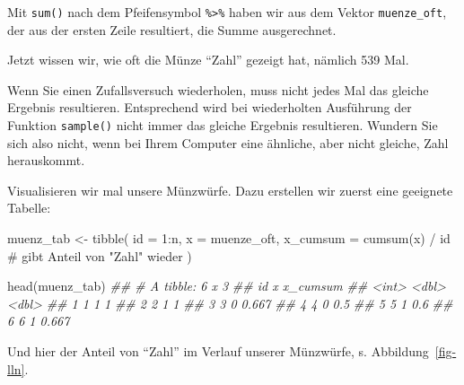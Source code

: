 \documentclass[
  a4paper,
  DIV=11]{scrreprt}
\newenvironment{Shaded}{\begin{snugshade}}{\end{snugshade}}
\newcommand{\AttributeTok}[1]{\textcolor[rgb]{0.40,0.45,0.13}{#1}}
\newcommand{\CommentTok}[1]{\textcolor[rgb]{0.37,0.37,0.37}{#1}}
\newcommand{\DecValTok}[1]{\textcolor[rgb]{0.68,0.00,0.00}{#1}}
\newcommand{\DocumentationTok}[1]{\textcolor[rgb]{0.37,0.37,0.37}{\textit{#1}}}
\newcommand{\FunctionTok}[1]{\textcolor[rgb]{0.28,0.35,0.67}{#1}}
\newcommand{\NormalTok}[1]{\textcolor[rgb]{0.00,0.23,0.31}{#1}}
\newcommand{\OtherTok}[1]{\textcolor[rgb]{0.00,0.23,0.31}{#1}}
\newcommand{\SpecialCharTok}[1]{\textcolor[rgb]{0.37,0.37,0.37}{#1}}
\theoremstyle{definition}
\theoremstyle{remark}
\begin{document}
Mit \texttt{sum()} nach dem Pfeifensymbol \texttt{\%\textgreater{}\%}
haben wir aus dem Vektor \texttt{muenze\_oft}, der aus der ersten Zeile
resultiert, die Summe ausgerechnet.

Jetzt wissen wir, wie oft die Münze ``Zahl'' gezeigt hat, nämlich 539
Mal.

\begin{tcolorbox}[enhanced jigsaw, left=2mm, colframe=quarto-callout-note-color-frame, opacityback=0, arc=.35mm, rightrule=.15mm, breakable, toptitle=1mm, colbacktitle=quarto-callout-note-color!10!white, colback=white, coltitle=black, bottomrule=.15mm, titlerule=0mm, opacitybacktitle=0.6, bottomtitle=1mm, title=\textcolor{quarto-callout-note-color}{\faInfo}\hspace{0.5em}{Hinweis}, toprule=.15mm, leftrule=.75mm]
Wenn Sie einen Zufallsversuch wiederholen, muss nicht jedes Mal das
gleiche Ergebnis resultieren. Entsprechend wird bei wiederholten
Ausführung der Funktion \texttt{sample()} nicht immer das gleiche
Ergebnis resultieren. Wundern Sie sich also nicht, wenn bei Ihrem
Computer eine ähnliche, aber nicht gleiche, Zahl herauskommt.
\end{tcolorbox}

Visualisieren wir mal unsere Münzwürfe. Dazu erstellen wir zuerst eine
geeignete Tabelle:

\begin{Shaded}
\begin{Highlighting}[]
\NormalTok{muenz\_tab }\OtherTok{\textless{}{-}}
  \FunctionTok{tibble}\NormalTok{(}
    \AttributeTok{id =} \DecValTok{1}\SpecialCharTok{:}\NormalTok{n,}
    \AttributeTok{x =}\NormalTok{ muenze\_oft,}
    \AttributeTok{x\_cumsum =} \FunctionTok{cumsum}\NormalTok{(x) }\SpecialCharTok{/}\NormalTok{ id  }\CommentTok{\# gibt Anteil von "Zahl" wieder}
\NormalTok{  )}

\FunctionTok{head}\NormalTok{(muenz\_tab)}
\DocumentationTok{\#\# \# A tibble: 6 x 3}
\DocumentationTok{\#\#      id     x x\_cumsum}
\DocumentationTok{\#\#   \textless{}int\textgreater{} \textless{}dbl\textgreater{}    \textless{}dbl\textgreater{}}
\DocumentationTok{\#\# 1     1     1    1    }
\DocumentationTok{\#\# 2     2     1    1    }
\DocumentationTok{\#\# 3     3     0    0.667}
\DocumentationTok{\#\# 4     4     0    0.5  }
\DocumentationTok{\#\# 5     5     1    0.6  }
\DocumentationTok{\#\# 6     6     1    0.667}
\end{Highlighting}
\end{Shaded}

Und hier der Anteil von ``Zahl'' im Verlauf unserer Münzwürfe, s.
Abbildung~\ref{fig-lln}.
\end{document}
